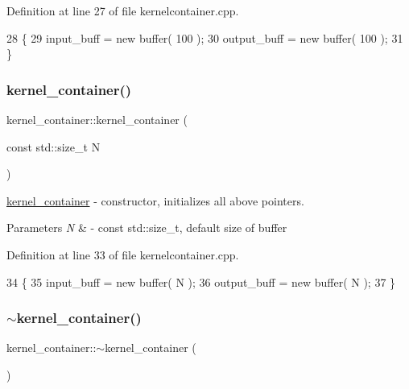 Definition at line 27 of file kernelcontainer.\+cpp.


\begin{DoxyCode}
28 \{
29    input\_buff  = \textcolor{keyword}{new} buffer( 100 );
30    output\_buff = \textcolor{keyword}{new} buffer( 100 );
31 \}
\end{DoxyCode}
\hypertarget{classkernel__container_a6d97cddd3d2f015166485afad9c71ff5}{}\label{classkernel__container_a6d97cddd3d2f015166485afad9c71ff5} 
\subsubsection{\texorpdfstring{kernel\+\_\+container()}{kernel\_container()}\hspace{0.1cm}{\footnotesize\ttfamily [2/2]}}
{\footnotesize\ttfamily kernel\+\_\+container\+::kernel\+\_\+container (\begin{DoxyParamCaption}\item[{const std\+::size\+\_\+t}]{N }\end{DoxyParamCaption})}

\hyperlink{classkernel__container}{kernel\+\_\+container} -\/ constructor, initializes all above pointers. 
\begin{DoxyParams}{Parameters}
{\em N} & -\/ const std\+::size\+\_\+t, default size of buffer \\
\hline
\end{DoxyParams}


Definition at line 33 of file kernelcontainer.\+cpp.


\begin{DoxyCode}
34 \{
35    input\_buff  = \textcolor{keyword}{new} buffer( N );
36    output\_buff = \textcolor{keyword}{new} buffer( N );
37 \}
\end{DoxyCode}
\hypertarget{classkernel__container_acec164e3f4c6f37f4791c90c24514b34}{}\label{classkernel__container_acec164e3f4c6f37f4791c90c24514b34} 
\subsubsection{\texorpdfstring{$\sim$kernel\+\_\+container()}{~kernel\_container()}}
{\footnotesize\ttfamily kernel\+\_\+container\+::$\sim$kernel\+\_\+container (\begin{DoxyParamCaption}{ }\end{DoxyParamCaption})}

